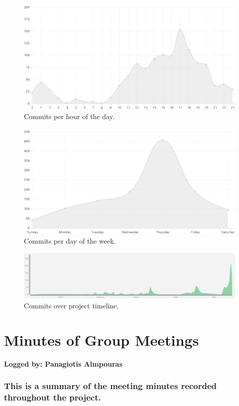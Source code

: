 \documentclass[a4paper,11pt]{article}
\begin{document}
\begin{appendices}
\begin{figure}[H]
\centering
\includegraphics[scale = 0.4]{commits_per_day_hour}
\caption{Commits per hour of the day.}
\end{figure}
\begin{figure}[H]
\centering
\includegraphics[scale = 0.4]{commits_per_weekday}
\caption{Commits per day of the week.}
\end{figure}
\begin{figure}[H]
\centering
\includegraphics[scale = 0.4]{git_graph}
\caption{Commits over project timeline.}
\end{figure}
\clearpage

\section{Minutes of Group Meetings}
\textbf{Logged by: Panagiotis Almpouras}
\subsubsection*{This is a summary of the meeting minutes recorded throughout the project.}
\maketitle

\end{appendices}
\end{document}
